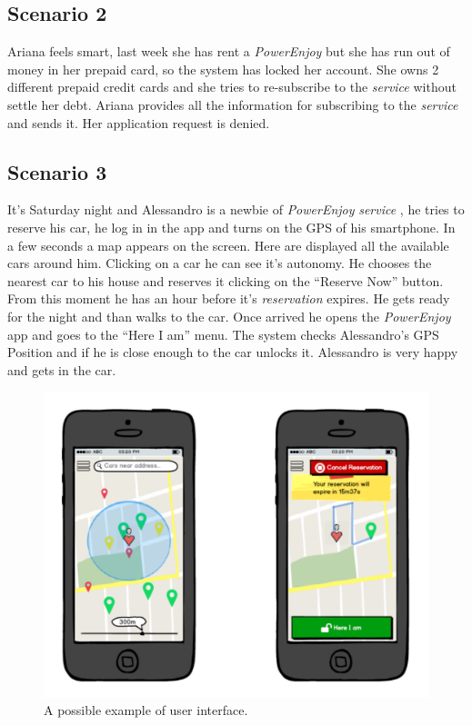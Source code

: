 \documentclass[english]{article}
\newcommand{\powerenjoy}{\textit{PowerEnjoy }}
\newcommand{\service}{\textit{service }}
\newcommand{\reservation}{\textit{reservation }}
\begin{document}
	\subsection{Scenario 2}
		Ariana feels smart, last week she has rent a \powerenjoy but she has run out of money in her prepaid card, so the system has locked her account. She owns 2 different prepaid credit cards and she tries to re-subscribe to the \service without settle her debt. Ariana provides all the information for subscribing to the \service and sends it. Her application request is denied.
	\subsection{Scenario 3}
		It's Saturday night and Alessandro is a newbie of \powerenjoy \service, he tries to reserve his car, he log in in the app and turns on the GPS of his smartphone. In a few seconds a map appears on the screen. Here are displayed all the available cars around him. Clicking on a car he can see it's autonomy. He chooses the nearest car to his house and reserves it clicking on the ``Reserve Now'' button. From this moment he has an hour before it's \reservation expires. He gets ready for the night and than walks to the car. Once arrived he opens the 	\powerenjoy app and goes to the ``Here I am'' menu. The system checks Alessandro's GPS Position and if he is close enough to the car unlocks it. Alessandro is very happy and gets in the car.
		
	\noindent
	\begin{figure}[H]
		\centering
		\includegraphics[scale=0.3]{UX.pdf}%
		\caption{ A possible example of user interface. }
	\end{figure}	
		
\end{document}
